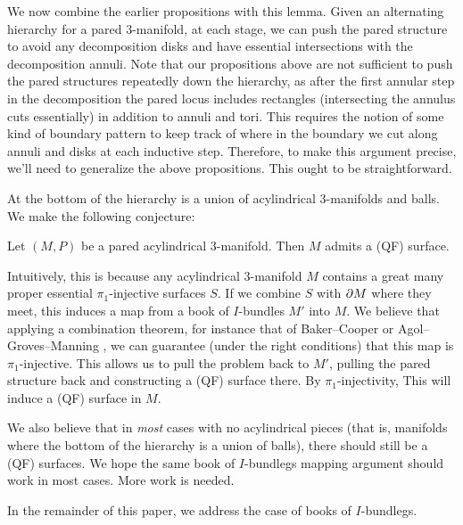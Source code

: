 We now combine the earlier propositions with this lemma. Given an alternating
hierarchy for a pared $3$-manifold, at each stage, we can push the pared
structure to avoid any decomposition disks and have essential intersections
with the decomposition annuli. Note that our propositions above are not
sufficient to push the pared structures repeatedly down the hierarchy, as after
the first annular step in the decomposition the pared locus includes rectangles
(intersecting the annulus cuts essentially) in addition to annuli and tori.
This requires the notion of some kind of boundary pattern to keep track of
where in the boundary we cut along annuli and disks at each inductive step.
Therefore, to make this argument precise, we'll need to generalize the above
propositions. This ought to be straightforward.

At the bottom of the hierarchy is a union of acylindrical $3$-manifolds and
balls. We make the following conjecture:

\begin{conj}

Let $(M,P)$ be a pared acylindrical $3$-manifold. Then $M$ admits a (QF) surface.

\end{conj}

Intuitively, this is because any acylindrical $3$-manifold $M$ contains a great
many proper essential $\pi_1$-injective surfaces $S$. If we combine $S$ with
$\partial M$ where they meet, this induces a map from a book of $I$-bundles $M'$
into $M$. We believe that applying a combination theorem, for instance that of
Baker--Cooper \cite{BCcombination} or Agol--Groves--Manning
\cite{AGMcombination}, we can guarantee (under the right conditions) that this
map is $\pi_1$-injective. This allows us to pull the problem back to $M'$,
pulling the pared structure back and constructing a (QF) surface there. By
$\pi_1$-injectivity, This will induce a (QF) surface in $M$.

We also believe that in \emph{most} cases with no acylindrical pieces (that is,
manifolds where the bottom of the hierarchy is a union of balls), there should
still be a (QF) surfaces. We hope the same book of $I$-bundlegs mapping
argument should work in most cases. More work is needed.

In the remainder of this paper, we address the case of books of $I$-bundlegs.
